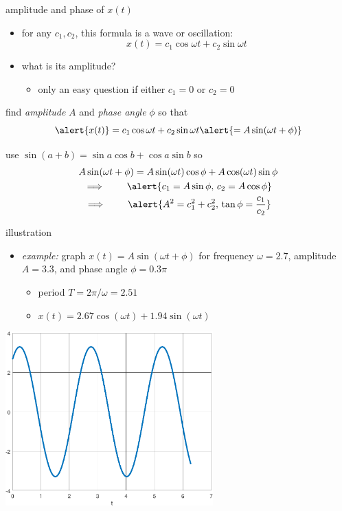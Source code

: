 \documentclass[urlcolor=blue,dvipsnames]{beamer}
\begin{document}
\begin{frame}{amplitude and phase of $x(t)$}

\begin{itemize}
\item for any $c_1,c_2$, this formula is a wave or oscillation:
    $$x(t) = c_1 \cos \omega t + c_2 \sin \omega t$$
\item what is its amplitude?
    \begin{itemize}
    \item only an easy question if either $c_1 =0$ or $c_2=0$
    \end{itemize}
\end{itemize}

 find  \emph{amplitude} $A$ and \emph{phase angle} $\phi$ so that
    $$\alert{x(t)} = c_1 \cos \omega t + c_2 \sin \omega t \alert{= A \sin(\omega t + \phi)}$$

 use $\sin(a+b) = \sin a \cos b + \cos a \sin b$ so
\begin{gather*}
A \sin(\omega t + \phi) = A \sin(\omega t) \cos\phi + A \cos(\omega t) \sin\phi \\
\implies \qquad \alert{c_1 = A \sin\phi, \, c_2 = A \cos \phi} \\
\implies \qquad \alert{A^2 = c_1^2 + c_2^2, \, \tan \phi = \frac{c_1}{c_2}}
\end{gather*}
\end{frame}


\begin{frame}{illustration}

\begin{itemize}
\item \emph{example:} graph $x(t) = A \sin(\omega t + \phi)$ for frequency $\omega=2.7$, amplitude $A=3.3$, and phase angle $\phi=0.3 \pi$
    \begin{itemize}
    \item period $T=2\pi/\omega = 2.51$
    \item $x(t) = 2.67 \cos(\omega t) + 1.94 \sin(\omega t)$
    \end{itemize}
\end{itemize}

\hfill \includegraphics[width=0.6\textwidth]{figs/altwave}
\end{frame}
\end{document}
